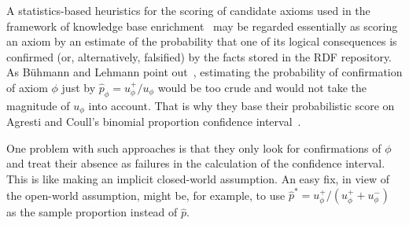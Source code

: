 \documentclass{llncs}
\begin{document}
A statistics-based heuristics for the scoring of candidate axioms used
in the framework of knowledge base enrichment~\cite{BuehmannLehmann2012}
may be regarded essentially as scoring an axiom by an estimate of the probability
that one of its logical consequences is confirmed (or, alternatively, falsified)
by the facts stored in the RDF repository.
As B\"uhmann and Lehmann point out~\cite{BuehmannLehmann2012},
estimating the probability of confirmation of axiom $\phi$ just by $\hat{p}_\phi = u_\phi^+/u_\phi$
would be too crude and would not take the magnitude of $u_\phi$ into account.
That is why they base their probabilistic score on Agresti and Coull's binomial proportion
confidence interval~\cite{AgrestiCoull1998}.

One problem with such approaches is that they only look for confirmations of $\phi$
and treat their absence as failures in the calculation of the confidence interval.
This is like making an implicit closed-world assumption.
An easy fix, in view of the open-world assumption, might be, for example, to use
$\hat{p}^* = u_\phi^+/(u_\phi^+ + u_\phi^-)$ as the sample proportion instead of $\hat{p}$.
\end{document}
